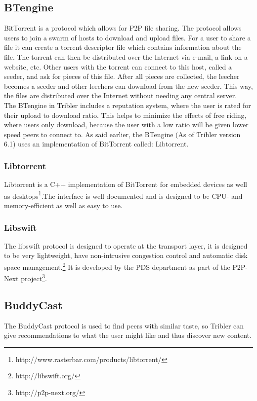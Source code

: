 \subsection{BTengine}
BitTorrent is a protocol which allows for P2P file sharing. The protocol allows users to join a swarm of hosts to download and upload files. For a user to share a file it can create a torrent descriptor file which contains information about the file. The torrent can then be distributed over the Internet via e-mail, a link on a website, etc. Other users with the torrent can connect to this host, called a seeder, and ask for pieces of this file. After all pieces are collected, the leecher becomes a seeder and other leechers can download from the new seeder. This way, the files are distributed over the Internet without needing any central server.\\ 
The BTengine in Tribler includes a reputation system, where the user is rated for their upload to download ratio. This helps to minimize the effects of free riding, where users only download, because the user with a low ratio will be given lower speed peers to connect to. As said earlier, the BTengine (As of Tribler version 6.1) uses an implementation of BitTorrent called: Libtorrent.

\subsubsection{Libtorrent}
Libtorrent is a C++ implementation of BitTorrent for embedded devices as well as desktops\footnote{http://www.rasterbar.com/products/libtorrent/}.The interface is well documented and is designed to be CPU- and memory-efficient as well as easy to use.

\subsubsection{Libswift}
The libswift protocol is designed to operate at the transport layer, it is designed to be very lightweight, have non-intrusive congestion control and automatic disk space management.\footnote{http://libswift.org/} It is developed by the PDS department as part of the P2P-Next project\footnote{http://p2p-next.org/}.

\subsection{BuddyCast}
The BuddyCast protocol is used to find peers with similar taste, so Tribler can give recommendations to what the user might like and thus discover new content. 

